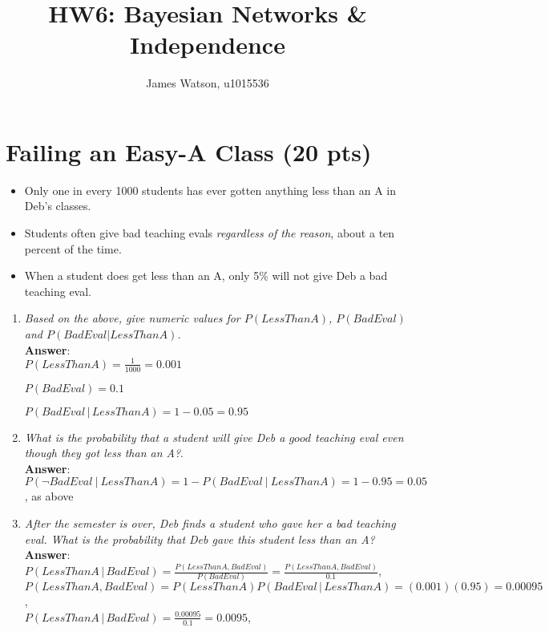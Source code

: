 \documentclass[fleqn]{hw6}
\title{HW6: Bayesian Networks \& Independence}
\institute{University of Utah}
\author{James Watson, u1015536}
\begin{document}
\maketitle


\section{Failing an Easy-A Class (20 pts)}
\begin{itemize}
	\item Only one in every 1000 students has ever gotten anything less than an A in Deb's classes.
	\item Students often give bad teaching evals \textit{regardless of the reason}, about a ten percent of the time.
	\item When a student does get less than an A, only 5\% will not give Deb a bad teaching eval. 
\end{itemize}



\begin{enumerate}
\item \textit{Based on the above, give numeric values for \(P(LessThanA)\), \(P(BadEval)\) and \(P(BadEval | LessThanA)\).}\\
\textbf{Answer}:\\

$\displaystyle P(LessThanA) = \frac{1}{1000} = \boxed{0.001}$ 

$\displaystyle P(BadEval) = \boxed{0.1} $

$\displaystyle P(BadEval\, |\, LessThanA) = 1 - 0.05 = \boxed{0.95} $

\item \textit{What is the probability that a student will give Deb a \(good\) teaching eval even though they got less than an A?}.\\
\textbf{Answer}:\\

$\displaystyle P(\neg BadEval\ |\ LessThanA) = 1 - P(BadEval\ |\ LessThanA) = 1 - 0.95 = \boxed{0.05}$, as above

\item \textit{After the semester is over, Deb finds a student who gave her a bad teaching eval. What is the probability that Deb gave this student less than an A?} \\
\textbf{Answer}:\\

$\displaystyle  P(LessThanA\, |\, BadEval) =  \frac{P(LessThanA,BadEval)}{P(BadEval)} = \frac{P(LessThanA,BadEval)}{0.1} $,\\
\vspace{6 bp}
$\displaystyle  P(LessThanA,BadEval) = P(LessThanA)P(BadEval\, |\, LessThanA) = (0.001)(0.95) = 0.00095 $, \\
\vspace{6 bp}
$\displaystyle  P(LessThanA\, |\, BadEval) = \frac{0.00095}{0.1} = \boxed{0.0095} $,\\

\end{enumerate}
\end{document}
